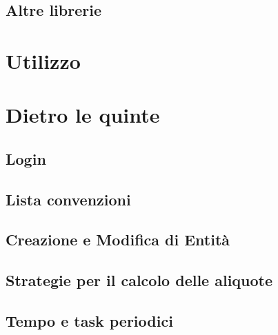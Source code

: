 \documentclass[a4paper,10pt]{report}
\begin{document}
\section{Altre librerie}
\label{libs}

\chapter{Utilizzo}
\label{howto}
\chapter{Dietro le quinte}
\label{code}
\section{Login}

\section{Lista convenzioni}


\section{Creazione e Modifica di Entità}


\section{Strategie per il calcolo delle aliquote}

\section{Tempo e task periodici}

\end{document}
